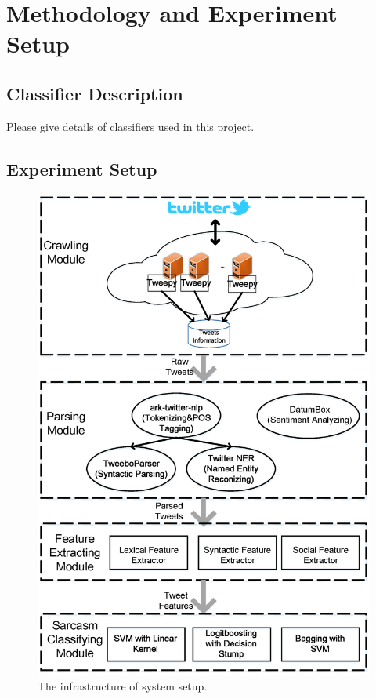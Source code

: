 \section{Methodology and Experiment Setup}
\label{sec:methodology}
\subsection{Classifier Description}
Please give details of classifiers used in this project.

\subsection{Experiment Setup}

\begin{figure}[htpb]
\centering
\includegraphics[scale=0.3]{infrastructure.eps}
\caption{The infrastructure of system setup.}
\label{fig:infrastructure}
\end{figure}
